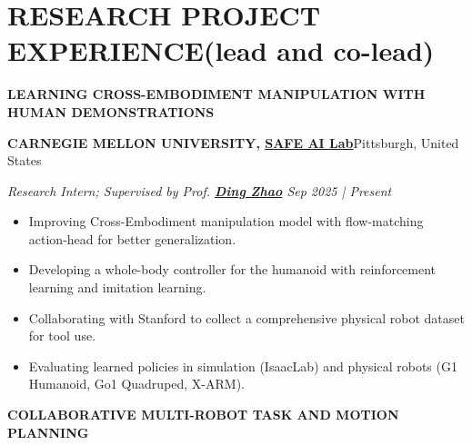 \documentclass[a4paper,9pt]{extarticle}
\begin{document}
\section*{{\textbf{\fontsize{14pt}{8pt}\selectfont R}\textbf{\scshape ESEARCH PROJECT EXPERIENCE}}(lead and co-lead)}
{\textbf{\fontsize{12pt}{4pt}\selectfont L}\textbf{\scshape EARNING CROSS-EMBODIMENT MANIPULATION WITH HUMAN DEMONSTRATIONS}}
\par\vspace{4pt}\noindent
\par\textbf{CARNEGIE MELLON UNIVERSITY, {\href{https://safeai-lab.github.io/}{SAFE AI Lab}}}\hfill Pittsburgh, United States  %
\par\textit{Research Intern; Supervised by Prof. {\href{https://www.meche.engineering.cmu.edu/directory/bios/zhao-ding.html}{\textbf{Ding Zhao}}}   \hfill Sep 2025 | Present}  %
\begin{itemize}
    \item Improving Cross-Embodiment manipulation model with flow-matching action-head for better generalization.
    \item Developing a whole-body controller for the humanoid with reinforcement learning and imitation learning.
    \item Collaborating with Stanford to collect a comprehensive physical robot dataset for tool use.
    \item Evaluating learned policies in simulation (IsaacLab) and physical robots (G1 Humanoid, Go1 Quadruped, X-ARM).  
\end{itemize}
{\textbf{\fontsize{12pt}{4pt}\selectfont C}\textbf{\scshape OLLABORATIVE MULTI-ROBOT TASK AND MOTION PLANNING}}
\par\vspace{4pt}\noindent
\end{document}
